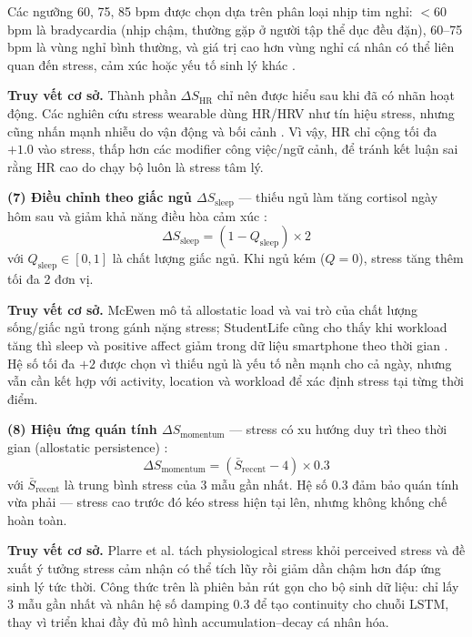 Các ngưỡng 60, 75, 85 bpm được chọn dựa trên phân loại nhịp tim nghỉ: $< 60$ bpm là bradycardia (nhịp chậm, thường gặp ở người tập thể dục đều đặn), 60--75 bpm là vùng nghỉ bình thường, và giá trị cao hơn vùng nghỉ cá nhân có thể liên quan đến stress, cảm xúc hoặc yếu tố sinh lý khác \cite{aha2024heart}.

\textbf{Truy vết cơ sở.} Thành phần $\Delta S_{\text{HR}}$ chỉ nên được hiểu sau khi đã có nhãn hoạt động. Các nghiên cứu stress wearable dùng HR/HRV như tín hiệu stress, nhưng cũng nhấn mạnh nhiễu do vận động và bối cảnh \cite{hovsepian2015cstress, stojchevska2022context}. Vì vậy, HR chỉ cộng tối đa $+1.0$ vào stress, thấp hơn các modifier công việc/ngữ cảnh, để tránh kết luận sai rằng HR cao do chạy bộ luôn là stress tâm lý.

\textbf{(7) Điều chỉnh theo giấc ngủ $\Delta S_{\text{sleep}}$} — thiếu ngủ làm tăng cortisol ngày hôm sau và giảm khả năng điều hòa cảm xúc \cite{mcewen2008central}:
\begin{equation}
    \Delta S_{\text{sleep}} = (1 - Q_{\text{sleep}}) \times 2
\end{equation}
với $Q_{\text{sleep}} \in [0, 1]$ là chất lượng giấc ngủ. Khi ngủ kém ($Q = 0$), stress tăng thêm tối đa 2 đơn vị.

\textbf{Truy vết cơ sở.} McEwen mô tả allostatic load và vai trò của chất lượng sống/giấc ngủ trong gánh nặng stress; StudentLife cũng cho thấy khi workload tăng thì sleep và positive affect giảm trong dữ liệu smartphone theo thời gian \cite{mcewen2008central, wang2014studentlife}. Hệ số tối đa $+2$ được chọn vì thiếu ngủ là yếu tố nền mạnh cho cả ngày, nhưng vẫn cần kết hợp với activity, location và workload để xác định stress tại từng thời điểm.

\textbf{(8) Hiệu ứng quán tính $\Delta S_{\text{momentum}}$} — stress có xu hướng duy trì theo thời gian (allostatic persistence) \cite{mcewen2008central, plarre2011continuous}:
\begin{equation}
    \Delta S_{\text{momentum}} = (\bar{S}_{\text{recent}} - 4) \times 0.3
\end{equation}
với $\bar{S}_{\text{recent}}$ là trung bình stress của 3 mẫu gần nhất. Hệ số 0.3 đảm bảo quán tính vừa phải — stress cao trước đó kéo stress hiện tại lên, nhưng không khống chế hoàn toàn.

\textbf{Truy vết cơ sở.} Plarre et al. tách physiological stress khỏi perceived stress và đề xuất ý tưởng stress cảm nhận có thể tích lũy rồi giảm dần chậm hơn đáp ứng sinh lý tức thời. Công thức trên là phiên bản rút gọn cho bộ sinh dữ liệu: chỉ lấy 3 mẫu gần nhất và nhân hệ số damping $0.3$ để tạo continuity cho chuỗi LSTM, thay vì triển khai đầy đủ mô hình accumulation--decay cá nhân hóa.

